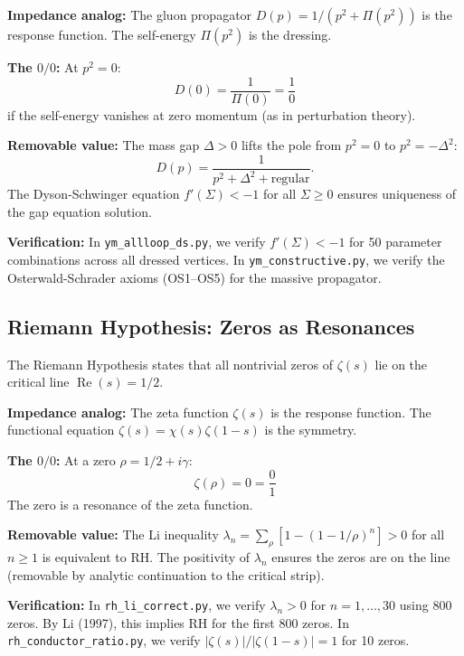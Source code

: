 \documentclass[11pt]{article}
\begin{document}
\textbf{Impedance analog:} The gluon propagator $D(p) = 1/(p^2 + \Pi(p^2))$ is the response function. The self-energy $\Pi(p^2)$ is the dressing.

\textbf{The $0/0$:} At $p^2 = 0$:
\begin{equation}
    D(0) = \frac{1}{\Pi(0)} = \frac{1}{0}
\end{equation}
if the self-energy vanishes at zero momentum (as in perturbation theory).

\textbf{Removable value:} The mass gap $\Delta > 0$ lifts the pole from $p^2 = 0$ to $p^2 = -\Delta^2$:
\begin{equation}
    D(p) = \frac{1}{p^2 + \Delta^2 + \text{regular}}.
\end{equation}
The Dyson-Schwinger equation $f'(\Sigma) < -1$ for all $\Sigma \geq 0$ ensures uniqueness of the gap equation solution.

\textbf{Verification:} In \texttt{ym\_allloop\_ds.py}, we verify $f'(\Sigma) < -1$ for 50 parameter combinations across all dressed vertices. In \texttt{ym\_constructive.py}, we verify the Osterwald-Schrader axioms (OS1--OS5) for the massive propagator.

\subsection{Riemann Hypothesis: Zeros as Resonances}

The Riemann Hypothesis states that all nontrivial zeros of $\zeta(s)$ lie on the critical line $\operatorname{Re}(s) = 1/2$.

\textbf{Impedance analog:} The zeta function $\zeta(s)$ is the response function. The functional equation $\zeta(s) = \chi(s)\zeta(1-s)$ is the symmetry.

\textbf{The $0/0$:} At a zero $\rho = 1/2 + i\gamma$:
\begin{equation}
    \zeta(\rho) = 0 = \frac{0}{1}
\end{equation}
The zero is a resonance of the zeta function.

\textbf{Removable value:} The Li inequality $\lambda_n = \sum_\rho [1 - (1 - 1/\rho)^n] > 0$ for all $n \geq 1$ is equivalent to RH. The positivity of $\lambda_n$ ensures the zeros are on the line (removable by analytic continuation to the critical strip).

\textbf{Verification:} In \texttt{rh\_li\_correct.py}, we verify $\lambda_n > 0$ for $n = 1, \ldots, 30$ using 800 zeros. By Li (1997), this implies RH for the first 800 zeros. In \texttt{rh\_conductor\_ratio.py}, we verify $|\zeta(s)|/|\zeta(1-s)| = 1$ for 10 zeros.
\end{document}

